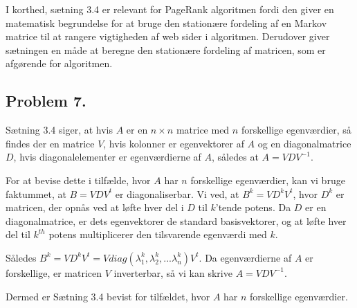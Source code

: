 I korthed, sætning 3.4 er relevant for PageRank algoritmen fordi den giver en matematisk begrundelse for at bruge den stationære fordeling af en Markov matrice til at rangere vigtigheden af web sider i algoritmen. Derudover giver sætningen en måde at beregne den stationære fordeling af matricen, som er afgørende for algoritmen.

\subsection*{Problem 7.}

Sætning 3.4 siger, at hvis $A$ er en $n \times n$ matrice med $n$ forskellige egenværdier, så findes der en matrice $V$, hvis kolonner er egenvektorer af $A$ og en diagonalmatrice $D$, hvis diagonalelementer er egenværdierne af $A$, således at $A = VDV^{-1}$.

For at bevise dette i tilfælde, hvor $A$ har $n$ forskellige egenværdier, kan vi bruge faktummet, at $B = V DV^{t}$ er diagonaliserbar. Vi ved, at $B^k = V D^{k} V^{t}$, hvor $D^{k}$ er matricen, der opnås ved at løfte hver del i $D$ til $k$'tende potens. Da $D$ er en diagonalmatrice, er dets egenvektorer de standard basisvektorer, og at løfte hver del til $k^{th}$ potens multiplicerer den tilsvarende egenværdi med $k$.

Således $B^k = V D^{k} V^{t} = V diag(\lambda_1^k, \lambda_2^k, . . . \lambda_n^k) V^{t}$. Da egenværdierne af $A$ er forskellige, er matricen $V$ inverterbar, så vi kan skrive $A = VDV^{-1}$.

Dermed er Sætning 3.4 bevist for tilfældet, hvor $A$ har $n$ forskellige egenværdier.






